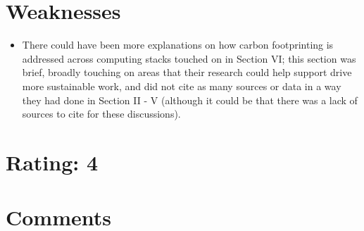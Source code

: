 \documentclass [12pt]{article}
\begin{document}
    \section{Weaknesses} %
    \label{sec:weaknesses}
        \begin{itemize}
            \item There could have been more explanations on how carbon footprinting is addressed across computing stacks touched on in Section VI; this section was brief, broadly touching on areas that their research could help support drive more sustainable work, and did not cite as many sources or data in a way they had done in Section II - V (although it could be that there was a lack of sources to cite for these discussions).
        \end{itemize}

    \section{Rating: 4} %
    \label{sec:rating}

    \section{Comments} %
    \label{sec:comments}
\end{document}
